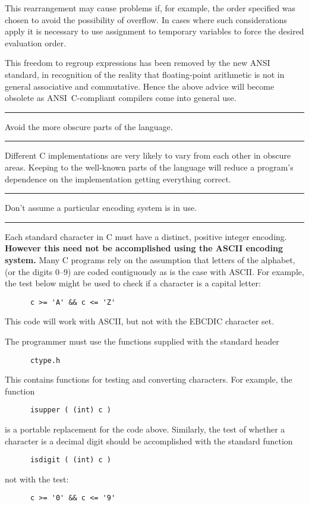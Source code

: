 \documentclass[twoside,11pt]{article}
\newcounter{sruleno}
\newcommand{\srule}[1]{
    \addtocounter{sruleno}{1}
    \goodbreak
    \rule[0.5ex]{\textwidth}{0.3mm}
    {\Large #1 \hfill {\thesruleno}}
    \rule[0.5ex]{\textwidth}{0.1mm}
}
\newcommand{\srule}[1]{
       \addtocounter{sruleno}{1}
       \begin{rawhtml} <HR> \end{rawhtml}
       {\Large \thesruleno}~~~~{\Large #1}
       \begin{rawhtml} <HR> \end{rawhtml}
       \end{tabular}
  }
\begin{document}
This rearrangement may cause problems if, for example, the order
specified was chosen to avoid the possibility of overflow.
In cases where such considerations apply
it is necessary to use assignment to temporary variables to force the
desired evaluation order.


This freedom to regroup expressions has been removed by the
new ANSI standard, in
recognition of the reality that floating-point arithmetic is not in general
associative and commutative. Hence the above advice will become obsolete as
ANSI~C-compliant compilers come into general use.



\srule{Avoid the more obscure parts of the language.}
Different C implementations are very likely to vary from each other
in obscure areas.
Keeping to the well-known parts of the language will reduce a
program's dependence on the implementation getting everything correct.


\srule{Don't assume a particular encoding system is in use.}
Each standard character in C must have a distinct, positive integer encoding.
{\bf However this need not be accomplished using the ASCII encoding system.}
Many C programs rely on the assumption that letters of the alphabet,
(or the digits 0--9) are coded contiguously as is the case with ASCII.
For example, the test below might be used to check if a character is
a capital letter:
\begin{verbatim}
      c >= 'A' && c <= 'Z'
\end{verbatim}
This code will work with ASCII, but not with the EBCDIC character set.

The programmer must use the functions supplied with the standard
header
\begin{verbatim}
      ctype.h
\end{verbatim}
This contains functions for testing and converting characters.  For example,
the function
\begin{verbatim}
      isupper ( (int) c )
\end{verbatim}
is a portable replacement for the code above.
Similarly, the test of whether a character is a decimal digit
should be accomplished with the standard function
\begin{verbatim}
      isdigit ( (int) c )
\end{verbatim}
not with the test:
\begin{verbatim}
      c >= '0' && c <= '9'
\end{verbatim}
\end{document}
